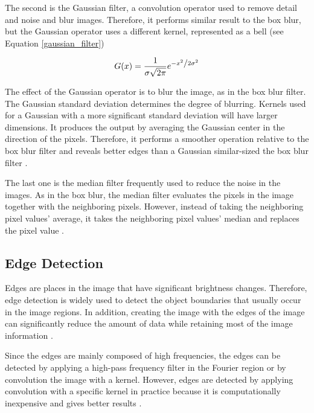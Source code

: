 The second is the Gaussian filter, a convolution operator used to remove detail and noise and blur images. Therefore, it performs similar result to the box blur, but the Gaussian operator uses a different kernel, represented as a bell \cite{getreuer2013survey} (see Equation \ref{gaussian_filter})

\begin{equation} \label{gaussian_filter}
G(x) = \frac{1} { {\sigma \sqrt {2\pi } } } 
e^{
    {
        { - {x} ^2 }
        \mathord{\left/ {\vphantom {{ - \left( {x - \mu } \right)^2 } {2\sigma ^2 }}} \right. \kern-\nulldelimiterspace} {2\sigma ^2 }
    }
}
\end{equation}

The effect of the Gaussian operator is to blur the image, as in the box blur filter. The Gaussian standard deviation determines the degree of blurring. Kernels used for a Gaussian with a more significant standard deviation will have larger dimensions. It produces the output by averaging the Gaussian center in the direction of the pixels. Therefore, it performs a smoother operation relative to the box blur filter and reveals better edges than a Gaussian similar-sized the box blur filter \cite{getreuer2013survey}.

The last one is the median filter frequently used to reduce the noise in the images. As in the box blur, the median filter evaluates the pixels in the image together with the neighboring pixels. However, instead of taking the neighboring pixel values' average, it takes the neighboring pixel values' median and replaces the pixel value \cite{russ2010image}.

\subsection{Edge Detection}

Edges are places in the image that have significant brightness changes. Therefore, edge detection is widely used to detect the object boundaries that usually occur in the image regions. In addition, creating the image with the edges of the image can significantly reduce the amount of data while retaining most of the image information \cite{russ2010image}.

Since the edges are mainly composed of high frequencies, the edges can be detected by applying a high-pass frequency filter in the Fourier region or by convolution the image with a kernel. However, edges are detected by applying convolution with a specific kernel in practice because it is computationally inexpensive and gives better results \cite{russ2010image}.

